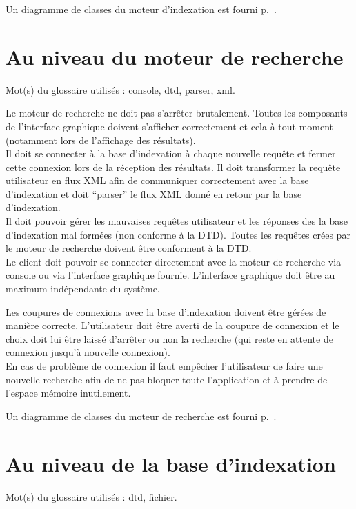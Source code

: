 Un diagramme de classes du moteur d'indexation est fourni p.~\pageref{diagramme_classes_mi}.

\section{Au niveau du moteur de recherche}
Mot(s) du glossaire utilisés : \gls{console}, \gls{dtd}, \gls{parser}, \gls{xml}.

Le moteur de recherche ne doit pas s'arrêter brutalement. Toutes les composants de l'interface graphique doivent s'afficher correctement et cela à tout moment (notamment lors de l'affichage des résultats).\\
Il doit se connecter à la base d'indexation à chaque nouvelle requête et fermer cette connexion lors de la réception des résultats. Il doit transformer la requête utilisateur en flux XML afin de communiquer correctement avec la base d'indexation et doit \enquote{parser} le flux XML donné  en retour par la base d'indexation.\\
Il doit pouvoir gérer les mauvaises requêtes utilisateur et les réponses des la base d'indexation mal formées (non conforme à la DTD). Toutes les requêtes crées par le moteur de recherche doivent être conforment à la DTD.\\
Le client doit pouvoir se connecter directement avec la moteur de recherche via console ou via l'interface graphique fournie. L'interface graphique doit être au maximum indépendante du système.

Les coupures de connexions avec la base d'indexation doivent être gérées de manière correcte. L'utilisateur doit être averti de la coupure de connexion et le choix doit lui être laissé d'arrêter ou non la recherche (qui reste en attente de connexion jusqu'à nouvelle connexion).\\
En cas de problème de connexion il faut empêcher l'utilisateur de faire une nouvelle recherche afin de ne pas bloquer toute l'application et à prendre de l'espace mémoire inutilement.

Un diagramme de classes du moteur de recherche est fourni p.~\pageref{diagramme_classes_mr}.

\section{Au niveau de la base d'indexation}
Mot(s) du glossaire utilisés : \gls{dtd}, \gls{fichier}.

